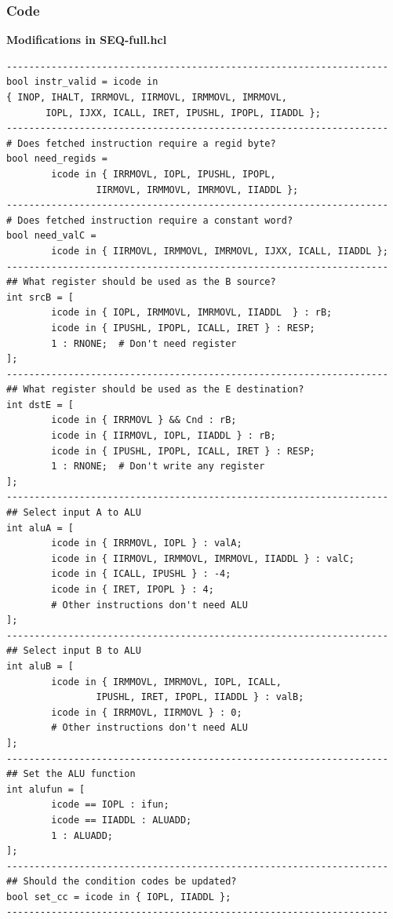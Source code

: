 \documentclass{article}
\begin{document}
\subsubsection{Code}
\begin{center}
        \textbf{Modifications in SEQ-full.hcl}
\end{center}
\begin{lstlisting}
--------------------------------------------------------------------
bool instr_valid = icode in 
{ INOP, IHALT, IRRMOVL, IIRMOVL, IRMMOVL, IMRMOVL,
       IOPL, IJXX, ICALL, IRET, IPUSHL, IPOPL, IIADDL };
--------------------------------------------------------------------
# Does fetched instruction require a regid byte?
bool need_regids =
        icode in { IRRMOVL, IOPL, IPUSHL, IPOPL, 
                IIRMOVL, IRMMOVL, IMRMOVL, IIADDL };
--------------------------------------------------------------------
# Does fetched instruction require a constant word?
bool need_valC =
        icode in { IIRMOVL, IRMMOVL, IMRMOVL, IJXX, ICALL, IIADDL };
--------------------------------------------------------------------
## What register should be used as the B source?
int srcB = [
        icode in { IOPL, IRMMOVL, IMRMOVL, IIADDL  } : rB;
        icode in { IPUSHL, IPOPL, ICALL, IRET } : RESP;
        1 : RNONE;  # Don't need register
];
--------------------------------------------------------------------
## What register should be used as the E destination?
int dstE = [
        icode in { IRRMOVL } && Cnd : rB;
        icode in { IIRMOVL, IOPL, IIADDL } : rB;
        icode in { IPUSHL, IPOPL, ICALL, IRET } : RESP;
        1 : RNONE;  # Don't write any register
];
--------------------------------------------------------------------
## Select input A to ALU
int aluA = [
        icode in { IRRMOVL, IOPL } : valA;
        icode in { IIRMOVL, IRMMOVL, IMRMOVL, IIADDL } : valC;
        icode in { ICALL, IPUSHL } : -4;
        icode in { IRET, IPOPL } : 4;
        # Other instructions don't need ALU
];
--------------------------------------------------------------------
## Select input B to ALU
int aluB = [
        icode in { IRMMOVL, IMRMOVL, IOPL, ICALL, 
                IPUSHL, IRET, IPOPL, IIADDL } : valB;
        icode in { IRRMOVL, IIRMOVL } : 0;
        # Other instructions don't need ALU
];
--------------------------------------------------------------------
## Set the ALU function
int alufun = [
        icode == IOPL : ifun;
        icode == IIADDL : ALUADD;
        1 : ALUADD;
];
--------------------------------------------------------------------
## Should the condition codes be updated?
bool set_cc = icode in { IOPL, IIADDL };
--------------------------------------------------------------------
\end{lstlisting}
\end{document}
